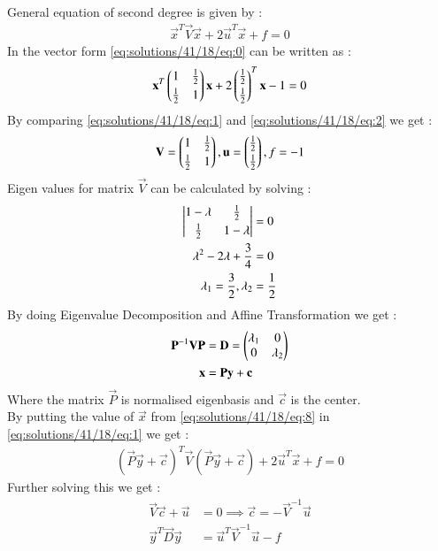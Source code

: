General equation of second degree is given by :
\begin{align}
\vec{x}^T\vec{V}\vec{x}+2\vec{u}^T\vec{x}+f=0\label{eq:solutions/41/18/eq:1}
\end{align}
In the vector form \eqref{eq:solutions/41/18/eq:0} can be written as :
\begin{align}
\mathbf{x}^T\begin{pmatrix}1&\frac{1}{2}\\[0.1cm]\frac{1}{2}&1\end{pmatrix}\mathbf{x}+2\begin{pmatrix}\frac{1}{2}\\[0.1 cm]\frac{1}{2}\end{pmatrix}^T\mathbf{x}-1=0\label{eq:solutions/41/18/eq:2}
\end{align}
By comparing \eqref{eq:solutions/41/18/eq:1} and \eqref{eq:solutions/41/18/eq:2} we get : 
\begin{align}
    \mathbf{V}=\begin{pmatrix}1&\frac{1}{2}\\[0.1cm]\frac{1}{2}&1\end{pmatrix},\mathbf{u}=\begin{pmatrix}\frac{1}{2}\\[0.1 cm]\frac{1}{2}\end{pmatrix},f=-1\label{eq:solutions/41/18/eq:3}
\end{align}
Eigen values for matrix $\vec{V}$ can be calculated by solving :  
\begin{align}
    \begin{vmatrix}1-\lambda&\frac{1}{2}\\[0.1cm]\frac{1}{2}&1-\lambda\end{vmatrix}&=0\\
    \lambda^2-2\lambda+\frac{3}{4}&=0\\
    \lambda_1=\frac{3}{2},\lambda_2&=\frac{1}{2}
\end{align}
By doing Eigenvalue Decomposition and Affine Transformation we get : 
\begin{align}
    \mathbf{P}^{-1}\mathbf{V}\mathbf{P}&=\mathbf{D}=\begin{pmatrix}\lambda_1&0\\0&\lambda_2\end{pmatrix}\\
    \mathbf{x}&=\mathbf{P}\mathbf{y}+\mathbf{c}\label{eq:solutions/41/18/eq:8}
\end{align}
Where the matrix $\vec{P}$ is normalised eigenbasis and $\vec{c}$ is the center.\\
By putting the value of $\vec{x}$ from \eqref{eq:solutions/41/18/eq:8} in \eqref{eq:solutions/41/18/eq:1} we get : 
\begin{align}
    (\vec{P}\vec{y}+\vec{c})^T\vec{V}(\vec{P}\vec{y}+\vec{c})+2\vec{u}^T\vec{x}+f=0
\end{align}
Further solving this we get : 
\begin{align}
    \vec{V}\vec{c}+\vec{u}&=0\implies\vec{c}=-\vec{V}^{-1}\vec{u}\label{eq:solutions/41/18/eq:10}\\
    \vec{y}^T\vec{D}\vec{y}&=\vec{u}^T\vec{V}^{-1}\vec{u}-f\label{eq:solutions/41/18/eq:11}
\end{align}
